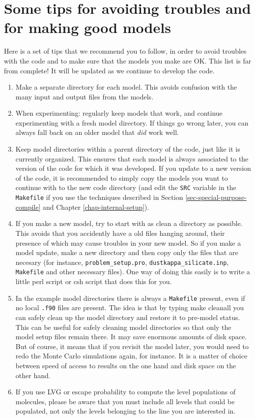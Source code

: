 \documentclass{report}
\begin{document}
\section{Some tips for avoiding troubles and for making good models}
Here is a set of tips that we recommend you to follow, in order to avoid
troubles with the code and to make sure that the models you make are OK.
This list is far from complete! It will be updated as we continue to
develop the code.
\begin{enumerate}
\item Make a separate directory for each model. This avoids confusion with
  the many input and output files from the models.
\item When experimenting: regularly keep models that work, and continue
  experimenting with a fresh model directory. If things go wrong later, you
  can always fall back on an older model that {\em did} work well.
\item Keep model directories within a parent directory of the code, just
  like it is currently organized. This ensures that each model is always
  associated to the version of the code for which it was developed.  If you
  update to a new version of the code, it is recommended to simply copy the
  models you want to continue with to the new code directory (and edit the
  {\small\tt SRC} variable in the {\small\tt Makefile} if you use the
  techniques described in Section \ref{sec-special-purpose-compile} and
  Chapter \ref{chap-internal-setup}).
\item If you make a new model, try to start with as clean a directory as
  possible. This avoids that you accidently have a old files hanging around,
  their presence of which may cause troubles in your new model.  So if you
  make a model update, make a new directory and then copy only the files
  that are necesary (for instance, {\small\tt problem\_setup.pro},
  {\small\tt dustkappa\_silicate.inp}, {\small\tt Makefile} and other
  necessary files). One way of doing this easily is to write a little perl
  script or csh script that does this for you.
\item In the example model directories there is always a {\small\tt Makefile}
  present, even if no local {\small\tt *.f90} files are present. The idea
  is that by typing {\small make cleanall} you can safely clean up the 
  model directory and restore it to pre-model status. This can be useful 
  for safely cleaning model directories so that only the model setup files
  remain there. It may save enormous amounts of disk space. But of course,
  it means that if you revisit the model later, you would need to redo
  the Monte Carlo simulations again, for instance. It is a matter of 
  choice between speed of access to results on the one hand and disk space
  on the other hand.
\item If you use LVG or escape probability to compute the level populations
  of molecules, please be aware that you must include all levels that could
  be populated, not only the levels belonging to the line you are interested
  in. 
\end{enumerate}
\end{document}
